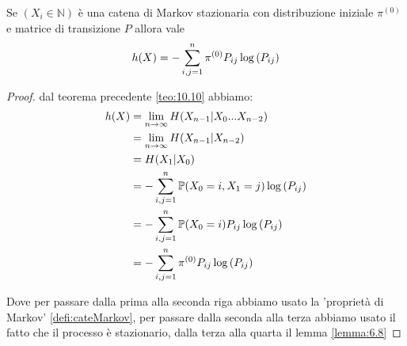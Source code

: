 \begin{teo}
Se $(X_i\in \mathbb{N})$ è una catena di Markov stazionaria con distribuzione iniziale $\pi^{(0)}$ e matrice di transizione $P$ allora vale
\begin{equation}
h(X)=-\sum_{i,j=1}^n \pi^{(0)} P_{ij} \log {(P_{ij})}
\end{equation}
\end{teo}
\begin{proof}
dal teorema precedente \ref{teo:10.10} abbiamo:
\[
\begin{split}
h(X) &=\lim_{n\to \infty} H(X_{n-1}|X_0...X_{n-2})\\
&=\lim_{n\to \infty} H(X_{n-1}|X_{n-2})\\
&=H(X_1|X_0)\\
&=-\sum_{i,j=1}^n \mathbb{P}(X_0=i,X_1=j)\log {(P_{ij})}\\
&=-\sum_{i,j=1}^n \mathbb{P}(X_0=i)P_{ij}\log {(P_{ij})}\\
&=-\sum_{i,j=1}^n \pi^{(0)}P_{ij}\log {(P_{ij})}
\end{split}
\]



Dove per passare dalla prima alla seconda riga abbiamo usato la 'proprietà di Markov' \ref{defi:cateMarkov}, per passare dalla seconda alla terza abbiamo usato il fatto che il processo è stazionario, dalla terza alla quarta il lemma \ref{lemma:6.8}
\end{proof}





